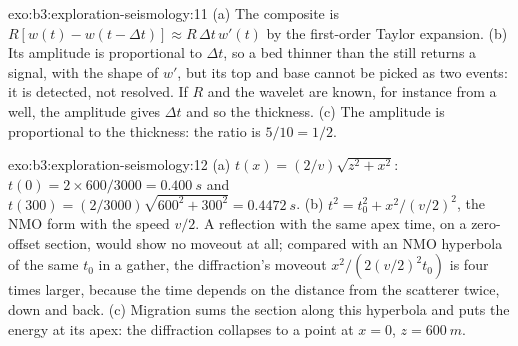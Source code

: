 \begin{solution}{exo:b3:exploration-seismology:11}
(a) The composite is $R[w(t) - w(t - \Delta t)] \approx R\,\Delta t\,w'(t)$ by
the first-order Taylor expansion. (b) Its amplitude is proportional to
$\Delta t$, so a bed thinner than the  still returns a signal,
with the shape of $w'$, but its top and base cannot be picked as two events: it
is detected, not resolved. If $R$ and the wavelet are known, for instance from a
well, the amplitude gives $\Delta t$ and so the thickness. (c) The amplitude is
proportional to the thickness: the ratio is $5/10 = 1/2$.
\end{solution}

\begin{solution}{exo:b3:exploration-seismology:12}
(a) $t(x) = (2/v)\sqrt{z^2 + x^2}$: $t(0) = 2\times600/3000 = \qty{0.400}{s}$ and
$t(300) = (2/3000)\sqrt{600^2 + 300^2} = \qty{0.4472}{s}$. (b) $t^2 = t_0^2 +
x^2/(v/2)^2$, the NMO form with the speed $v/2$. A reflection with the same apex
time, on a zero-offset section, would show no moveout at all; compared with an
NMO hyperbola of the same $t_0$ in a gather, the diffraction's moveout
$x^2/(2(v/2)^2t_0)$ is four times larger, because the time depends on the
distance from the scatterer twice, down and back. (c) Migration sums the
section along this hyperbola and puts the energy at its apex: the diffraction
collapses to a point at $x = 0$, $z = \qty{600}{m}$.
\end{solution}

